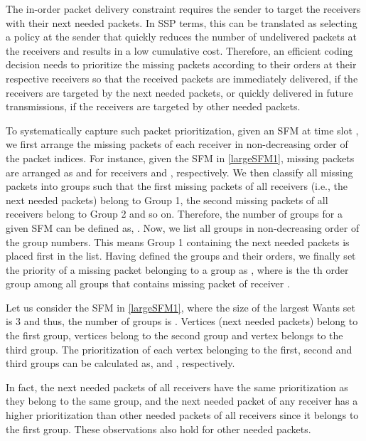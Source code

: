\documentclass[12pt, peerreview, onecolumn]{IEEEtran}
\begin{document}
The in-order packet delivery  constraint requires the sender to target the receivers with their next needed  packets. In SSP terms,  this can be translated  as selecting a policy at the sender  that quickly reduces    the number  of undelivered packets  at the receivers  and results in a low cumulative  cost. Therefore, an efficient coding decision needs to prioritize the missing packets according to  their orders at their respective receivers so that the received packets are immediately  delivered, if the receivers are  targeted by the next needed packets, or   quickly delivered in future transmissions, if the receivers are targeted by other needed packets.


To systematically  capture such  packet prioritization, given an SFM at time slot , we first arrange  the missing packets  of each receiver in non-decreasing order of the  packet indices.  For instance, given the SFM in \eqref{largeSFM1}, missing packets are arranged as  and  for receivers  and , respectively. We  then classify all  missing packets into groups  such that    the first missing packets of all receivers (i.e., the next needed packets) belong to  Group 1, the second missing packets of all receivers belong to  Group 2 and so on. Therefore,  the   number of groups for a given SFM can be defined as, . Now, we list all groups in non-decreasing order of the group numbers. This means   Group 1 containing the next needed packets is placed first in the list.  Having defined the  groups and their orders, we finally set the priority of a missing packet belonging to a group as , where  is the   th order group among all  groups that contains missing packet  of receiver . 


\begin{examples} Let us consider the SFM in  \eqref{largeSFM1}, where  the size of the largest Wants set is 3  and thus, the number of groups is . Vertices  (next needed packets)\footnotemark {}  belong to the first group,  vertices   belong to the second group  and  vertex  belongs to the third group. The prioritization of each vertex belonging to the first, second and third  groups can be calculated as,    and , respectively.
\end{examples}

In fact, the next needed packets of all receivers  have the same prioritization as they belong to the same group, and the next needed packet of any receiver has a higher prioritization than  other needed packets of all receivers since it belongs to the first group. These observations also hold for other needed packets.
\end{document}
